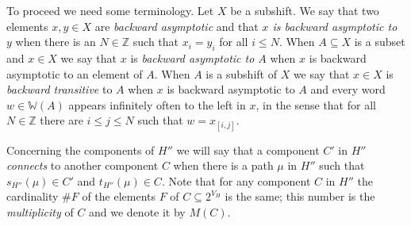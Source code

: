 \documentclass[12pt,oneside,english]{amsart}
\begin{document}
To proceed we need some terminology. Let $X$ be a subshift. We say that two elements $x,y \in X$ are \emph{backward asymptotic} and that \emph{$x$ is backward asymptotic to $y$} when there is an $N \in \mathbb Z$ such that $x_i=y_i$ for all $i \leq N$. When $A \subseteq X$ is a subset and $x \in X$ we say that $x$ is \emph{backward asymptotic to $A$} when $x$ is backward asymptotic to an element of $A$. When $A$ is a subshift of $X$ we say that $x \in X$ is \emph{backward transitive} to $A$ when $x$ is backward asymptotic to $A$ and every word $w \in \mathbb W(A)$ appears infinitely often to the left in $x$, in the sense that for all $N\in \mathbb Z$ there are $i \leq j \leq N$ such that $w =x_{[i,j]}$. 

Concerning the components of $H''$ we will say that a component $C'$ in $H''$ \emph{connects} to another component $C$ when there is a path $\mu$ in $H''$ such that $s_{H''}(\mu) \in C'$ and $t_{H''}(\mu) \in C$. Note that for any component $C$ in $H''$ the cardinality $\# F$ of the elements $F$ of $C \subseteq 2^{V_H}$ is the same; this number is the \emph{multiplicity} of $C$ and we denote it by $M(C)$.
 
\end{document}
